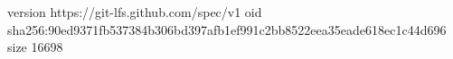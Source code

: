 version https://git-lfs.github.com/spec/v1
oid sha256:90ed9371fb537384b306bd397afb1ef991c2bb8522eea35eade618ec1c44d696
size 16698
